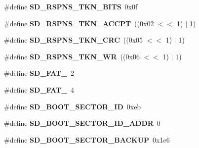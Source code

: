 \begin{DoxyCompactItemize}
\item 
\hypertarget{group__sd__private_ga497c443f864536ab539907813127cf2b}{\#define {\bfseries \-S\-D\-\_\-\-R\-S\-P\-N\-S\-\_\-\-T\-K\-N\-\_\-\-B\-I\-T\-S}~0x0f}\label{group__sd__private_ga497c443f864536ab539907813127cf2b}

\item 
\hypertarget{group__sd__private_gade70458e7d4df8bd1dffbb8a3b4ba319}{\#define {\bfseries \-S\-D\-\_\-\-R\-S\-P\-N\-S\-\_\-\-T\-K\-N\-\_\-\-A\-C\-C\-P\-T}~((0x02 $<$$<$ 1) $|$ 1)}\label{group__sd__private_gade70458e7d4df8bd1dffbb8a3b4ba319}

\item 
\hypertarget{group__sd__private_ga47a1e03367849abb72f3c6befff76731}{\#define {\bfseries \-S\-D\-\_\-\-R\-S\-P\-N\-S\-\_\-\-T\-K\-N\-\_\-\-C\-R\-C}~((0x05 $<$$<$ 1) $|$ 1)}\label{group__sd__private_ga47a1e03367849abb72f3c6befff76731}

\item 
\hypertarget{group__sd__private_gaa2a7f8f19ed2862b82459cbeae2351eb}{\#define {\bfseries \-S\-D\-\_\-\-R\-S\-P\-N\-S\-\_\-\-T\-K\-N\-\_\-\-W\-R}~((0x06 $<$$<$ 1) $|$ 1)}\label{group__sd__private_gaa2a7f8f19ed2862b82459cbeae2351eb}

\item 
\hypertarget{group__sd__private_ga56add532f148d4f709e8edab807f3267}{\#define {\bfseries \-S\-D\-\_\-\-F\-A\-T\-\_}~2}\label{group__sd__private_ga56add532f148d4f709e8edab807f3267}

\item 
\hypertarget{group__sd__private_gac62f823f15cdf9329a67340404939dc9}{\#define {\bfseries \-S\-D\-\_\-\-F\-A\-T\-\_}~4}\label{group__sd__private_gac62f823f15cdf9329a67340404939dc9}

\item 
\hypertarget{group__sd__private_ga8a22826ee5415da602f652d70d085062}{\#define {\bfseries \-S\-D\-\_\-\-B\-O\-O\-T\-\_\-\-S\-E\-C\-T\-O\-R\-\_\-\-I\-D}~0xeb}\label{group__sd__private_ga8a22826ee5415da602f652d70d085062}

\item 
\hypertarget{group__sd__private_ga3cd785b99f266c9725112304007f91b2}{\#define {\bfseries \-S\-D\-\_\-\-B\-O\-O\-T\-\_\-\-S\-E\-C\-T\-O\-R\-\_\-\-I\-D\-\_\-\-A\-D\-D\-R}~0}\label{group__sd__private_ga3cd785b99f266c9725112304007f91b2}

\item 
\hypertarget{group__sd__private_gac565055b241edde16d3e00c6a0b5fa6a}{\#define {\bfseries \-S\-D\-\_\-\-B\-O\-O\-T\-\_\-\-S\-E\-C\-T\-O\-R\-\_\-\-B\-A\-C\-K\-U\-P}~0x1c6}\label{group__sd__private_gac565055b241edde16d3e00c6a0b5fa6a}


\end{DoxyCompactItemize}
